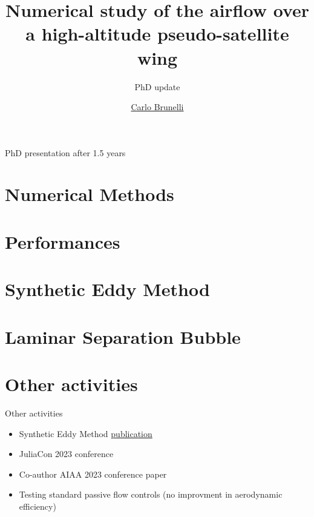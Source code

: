 \documentclass{beamer}
\title{Numerical study of the airflow over a high-altitude pseudo-satellite wing}
\subtitle{PhD update}
\author{\href{mailto:mail@carlobrunelli.com}{Carlo Brunelli}}
\begin{document}
\maketitle


\begin{frame}

PhD presentation after 1.5 years

\end{frame}

\section{Numerical Methods}



\section{Performances}


\section{Synthetic Eddy Method}



\section{Laminar Separation Bubble}




\section{Other activities}
\begin{frame}{Other activities}
\begin{itemize}
	\item Synthetic Eddy Method \href{https://www.theoj.org/joss-papers/joss.05565/10.21105.joss.05565.pdf}{publication}
	\item JuliaCon 2023 conference
	\item Co-author AIAA 2023 conference paper
\end{itemize}

\begin{itemize}
	\item Testing standard passive flow controls (no improvment in aerodynamic efficiency)
\end{itemize}

\end{frame}
\end{document}
